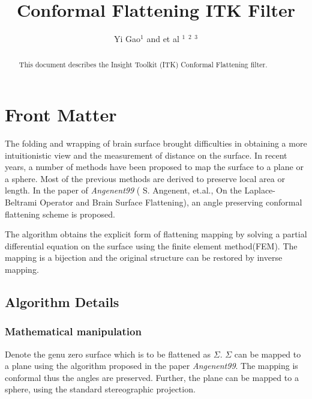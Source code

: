 \documentclass{InsightArticle}
\title{Conformal Flattening ITK Filter}
\author{Yi Gao$^{1}$ and et al $^{1}$ $^{2}$ $^{3}$}
\begin{document}
\newif\ifpdf
\ifx\pdfoutput\undefined
  \pdffalse
\else
  \pdftrue
\fi


\ifpdf
\else
   \DeclareGraphicsExtensions{.eps,.jpg,.gif,.tiff,.bmp,.png}
   \DeclareGraphicsRule{.jpg}{eps}{.jpg.bb}{`convert #1 eps:-}
   \DeclareGraphicsRule{.gif}{eps}{.gif.bb}{`convert #1 eps:-}
   \DeclareGraphicsRule{.tiff}{eps}{.tiff.bb}{`convert #1 eps:-}
   \DeclareGraphicsRule{.bmp}{eps}{.bmp.bb}{`convert #1 eps:-}
   \DeclareGraphicsRule{.png}{eps}{.png.bb}{`convert #1 eps:-}
\fi


\maketitle


\ifhtml
\chapter*{Front Matter\label{front}}
\fi


\begin{abstract}
\noindent This document describes the Insight Toolkit (ITK)
Conformal Flattening filter.
\end{abstract}

\tableofcontents

The folding and wrapping of brain surface brought difficulties in obtaining a more 
intuitionistic view and the measurement of distance on the surface. In recent years, 
a number of methods have been proposed to map the surface to a plane or a sphere. 
Most of the previous methods are derived to preserve local area or length. 
In the paper of \emph{Angenent99} ( S. Angenent, et.al., On the Laplace-Beltrami 
Operator and Brain Surface Flattening), an angle preserving conformal flattening scheme is proposed.

The algorithm obtains the explicit form of flattening mapping by solving a partial 
differential equation on the surface using the finite element method(FEM). The mapping is a 
bijection and the original structure can be restored by inverse mapping.

\section{Algorithm Details}

\subsection{Mathematical manipulation}
  Denote the genu zero surface which is to be flattened as $\Sigma$. 
  $\Sigma$ can be mapped to a plane using the algorithm proposed in
  the paper \emph{Angenent99}. The mapping is conformal thus the angles are preserved.
  Further, the plane can be mapped to a sphere, using the standard stereographic
  projection.
  
\end{document}
